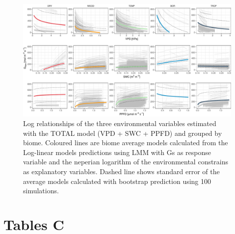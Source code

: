 \documentclass[11pt,twoside]{reedthesis}
\begin{document}
\newpage

\setlength{\abovecaptionskip}{15pt}
\begin{figure}[hbt!]

{\centering \includegraphics[width=1\linewidth]{figure/appendixC/spa_plots} 

}

\caption[Log relationships of the three environmental variables estimated with the TOTAL model (VPD + SWC + PPFD) and grouped by biome.]{Log relationships of the three environmental variables estimated with the TOTAL model (VPD + SWC + PPFD) and grouped by biome. Coloured lines are biome average models calculated from the Log-linear models predictions using LMM with Gs as response variable and the neperian logarithm of the environmental constrains as explanatory variables. Dashed line shows standard error of the average models calculated with bootstrap prediction using 100 simulations.}\label{fig:unnamed-chunk-11}
\end{figure}
\setlength{\abovecaptionskip}{0pt} \newpage

\section{Tables C}\label{tables-c}
\end{document}
